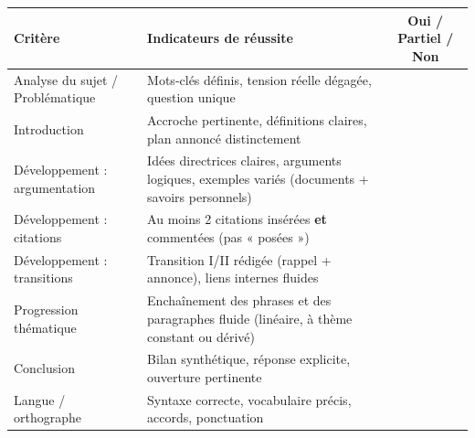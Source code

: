 \documentclass[11pt]{article}
\begin{document}
\begin{exemplebox}
\begin{center}
\begin{tabularx}{\linewidth}{|l|X|c|}\hline
\rowcolor{popblueL}
\textbf{Critère} & \textbf{Indicateurs de réussite} & \textbf{Oui / Partiel / Non} \\ \hline
Analyse du sujet / Problématique & Mots-clés définis, tension réelle dégagée, question unique & \\ \hline
Introduction & Accroche pertinente, définitions claires, plan annoncé distinctement & \\ \hline
Développement : argumentation & Idées directrices claires, arguments logiques, exemples variés (documents + savoirs personnels) & \\ \hline
Développement : citations & Au moins 2 citations insérées \textbf{et} commentées (pas « posées ») & \\ \hline
Développement : transitions & Transition I/II rédigée (rappel + annonce), liens internes fluides & \\ \hline
Progression thématique & Enchaînement des phrases et des paragraphes fluide (linéaire, à thème constant ou dérivé) & \\ \hline
Conclusion & Bilan synthétique, réponse explicite, ouverture pertinente & \\ \hline
Langue / orthographe & Syntaxe correcte, vocabulaire précis, accords, ponctuation & \\ \hline
\end{tabularx}
\end{center}
\end{exemplebox}
\end{document}
